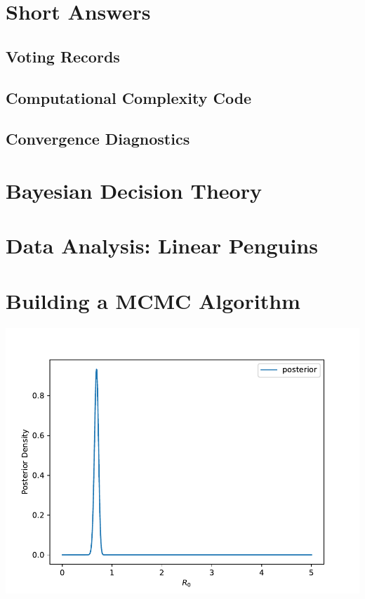\documentclass[]{article}
\title{STAT 6300 Problem Set #2}
\author{Anthony Barrows, Nicholas Thielsen}
\begin{document}
\maketitle


\section{Short Answers}

\subsection{Voting Records}

\subsection{Computational Complexity Code}

\subsection{Convergence Diagnostics}

\section{Bayesian Decision Theory}

\section{Data Analysis: Linear Penguins}

\section{Building a MCMC Algorithm}

\includegraphics[width=\textwidth]{r0_posterior_density}
\end{document}
